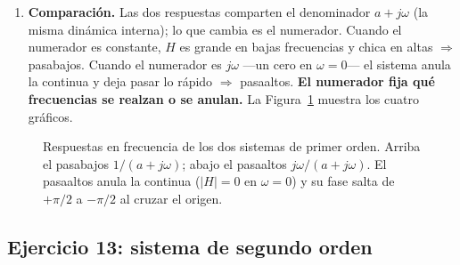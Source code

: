\documentclass[10pt,a4paper]{article}
\begin{document}
\begin{enumerate}[label=\textbf{\alph*)}]
		\item \textbf{Comparación.} Las dos respuestas comparten el denominador $a+j\omega$ (la misma dinámica interna); lo que cambia es el numerador. Cuando el numerador es constante, $H$ es grande en bajas frecuencias y chica en altas $\Rightarrow$ pasabajos. Cuando el numerador es $j\omega$ ---un cero en $\omega=0$--- el sistema anula la continua y deja pasar lo rápido $\Rightarrow$ pasaaltos. \textbf{El numerador fija qué frecuencias se realzan o se anulan.} La Figura~\ref{fig:sol_ej13} muestra los cuatro gráficos.
	\end{enumerate}

	\begin{figure}[H]
		\centering
		
		\caption{Respuestas en frecuencia de los dos sistemas de primer orden. Arriba el pasabajos $1/(a+j\omega)$; abajo el pasaaltos $j\omega/(a+j\omega)$. El pasaaltos anula la continua ($|H|=0$ en $\omega=0$) y su fase salta de $+\pi/2$ a $-\pi/2$ al cruzar el origen.}
		\label{fig:sol_ej13}
	\end{figure}

	\subsection*{Ejercicio 13: sistema de segundo orden}
\end{document}
